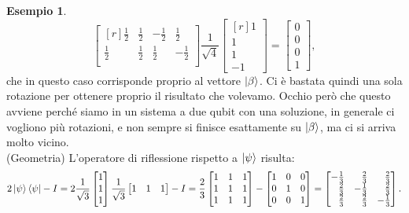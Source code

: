 \documentclass{book}
\theoremstyle{definition}
\theoremstyle{definition}
\theoremstyle{definition}
\newtheorem*{ex}{Esempio}
\theoremstyle{plain}
\theoremstyle{plain}
\theoremstyle{plain}
\theoremstyle{plain}
\begin{document}
\begin{ex}
\begin{displaymath}
\begin{bmatrix*}[r]
\frac{1}{2} & \frac{1}{2} & -\frac{1}{2} & \frac{1}{2} \\
\frac{1}{2} & \frac{1}{2} & \frac{1}{2} & -\frac{1}{2} \\
\end{bmatrix*}
\frac{1}{\sqrt{4}} \begin{bmatrix*}[r]
1 \\
1 \\
1 \\
-1
\end{bmatrix*}
= 
\begin{bmatrix}
0 \\
0 \\
0 \\
1
\end{bmatrix},
\end{displaymath}
che in questo caso corrisponde proprio al vettore $\ket{\beta}$. Ci è bastata quindi una sola rotazione per ottenere proprio il risultato che volevamo. Occhio però che questo avviene perché siamo in un sistema a due qubit con una soluzione, in generale ci vogliono più rotazioni, e non sempre si finisce esattamente su $\ket{\beta}$, ma ci si arriva molto vicino. \\
(Geometria) L'operatore di riflessione rispetto a $\ket{\psi}$ risulta:
\begin{displaymath}
2\ket{\psi}\bra{\psi} - I = 2 \frac{1}{\sqrt{3}}\begin{bmatrix}
1 \\
1 \\
1
\end{bmatrix}
\frac{1}{\sqrt{3}} \begin{bmatrix}
1 & 1 & 1 \\
\end{bmatrix}
- I = \frac{2}{3} \begin{bmatrix}
1 & 1 & 1 \\
1 & 1 & 1 \\
1 & 1 & 1 \\
\end{bmatrix}
- \begin{bmatrix}
1 & 0 & 0 \\
0 & 1 & 0 \\
0 & 0 & 1 
\end{bmatrix} = \begin{bmatrix*}[r]
-\frac{1}{3} & \frac{2}{3} & \frac{2}{3}\\
\frac{2}{3} & -\frac{1}{3} & \frac{2}{3}\\
\frac{2}{3} & \frac{2}{3} & -\frac{1}{3}
\end{bmatrix*}.

\end{displaymath}
\end{ex}
\end{document}
